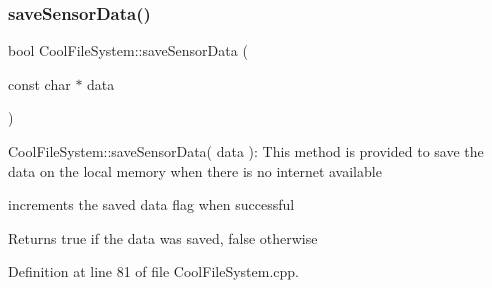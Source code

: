 \subsubsection{\texorpdfstring{save\+Sensor\+Data()}{saveSensorData()}}
{\footnotesize\ttfamily bool Cool\+File\+System\+::save\+Sensor\+Data (\begin{DoxyParamCaption}\item[{const char $\ast$}]{data }\end{DoxyParamCaption})}

Cool\+File\+System\+::save\+Sensor\+Data( data )\+: This method is provided to save the data on the local memory when there is no internet available

increments the saved data flag when successful

\begin{DoxyReturn}{Returns}
true if the data was saved, false otherwise 
\end{DoxyReturn}


Definition at line 81 of file Cool\+File\+System.\+cpp.


